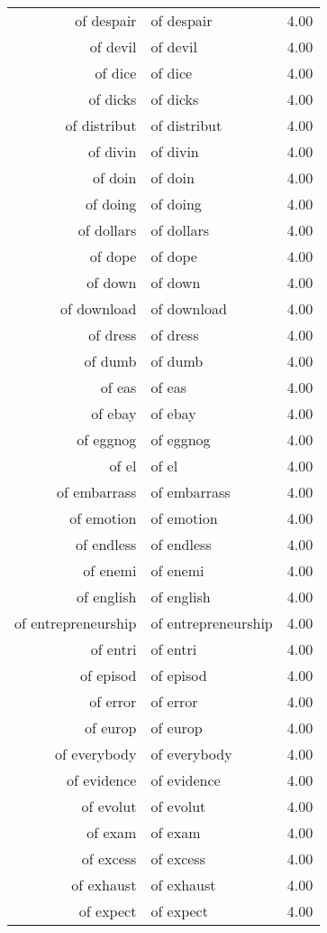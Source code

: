 \begin{table}[ht]
\begin{tabular}{rlr}
  of despair & of despair & 4.00 \\ 
  of devil & of devil & 4.00 \\ 
  of dice & of dice & 4.00 \\ 
  of dicks & of dicks & 4.00 \\ 
  of distribut & of distribut & 4.00 \\ 
  of divin & of divin & 4.00 \\ 
  of doin & of doin & 4.00 \\ 
  of doing & of doing & 4.00 \\ 
  of dollars & of dollars & 4.00 \\ 
  of dope & of dope & 4.00 \\ 
  of down & of down & 4.00 \\ 
  of download & of download & 4.00 \\ 
  of dress & of dress & 4.00 \\ 
  of dumb & of dumb & 4.00 \\ 
  of eas & of eas & 4.00 \\ 
  of ebay & of ebay & 4.00 \\ 
  of eggnog & of eggnog & 4.00 \\ 
  of el & of el & 4.00 \\ 
  of embarrass & of embarrass & 4.00 \\ 
  of emotion & of emotion & 4.00 \\ 
  of endless & of endless & 4.00 \\ 
  of enemi & of enemi & 4.00 \\ 
  of english & of english & 4.00 \\ 
  of entrepreneurship & of entrepreneurship & 4.00 \\ 
  of entri & of entri & 4.00 \\ 
  of episod & of episod & 4.00 \\ 
  of error & of error & 4.00 \\ 
  of europ & of europ & 4.00 \\ 
  of everybody & of everybody & 4.00 \\ 
  of evidence & of evidence & 4.00 \\ 
  of evolut & of evolut & 4.00 \\ 
  of exam & of exam & 4.00 \\ 
  of excess & of excess & 4.00 \\ 
  of exhaust & of exhaust & 4.00 \\ 
  of expect & of expect & 4.00 \\ 

\end{tabular}
\end{table}
